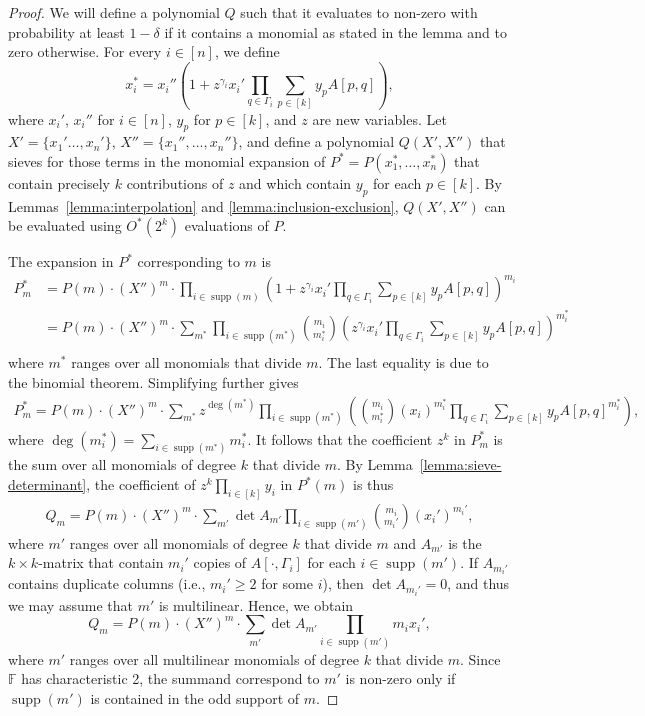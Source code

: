 \documentclass[10pt,a4paper]{article}
\newcommand{\F}{\ensuremath{\mathbb F}\xspace}
\DeclareMathOperator{\supp}{supp}
\begin{document}
\begin{proof}
  We will define a polynomial $Q$ such that it evaluates to non-zero with probability at least $1 - \delta$ if it contains a monomial as stated in the lemma and to zero otherwise.
  For every $i \in [n]$, we define
  \[
    x_i^* = x_i'' (1+z^{\gamma_i} x_i' \prod_{q \in \Gamma_i} \sum_{p \in [k]} y_{p} A[p,q]),
  \]
  where $x_i'$, $x_i''$ for $i \in [n]$, $y_p$ for $p \in [k]$, and $z$ are new variables. 
  Let $X' = \{ x_1' \ldots, x_n' \}$, $X'' = \{ x_1'', \ldots, x_n'' \}$, and define a polynomial $Q(X', X'')$ that 
  sieves for those terms in the monomial expansion of
  $P^* = P(x_1^*,\ldots,x_n^*)$ that contain precisely $k$ contributions of $z$ and 
  which contain $y_p$ for each $p \in [k]$.
  By Lemmas~\ref{lemma:interpolation} and \ref{lemma:inclusion-exclusion}, $Q(X', X'')$ can be evaluated using $O^*(2^{k})$ evaluations of $P$.

  The expansion in $P^*$ corresponding to $m$ is
  \begin{align*}
    P^*_m
    &= P(m) \cdot (X'')^m \cdot \prod_{i \in \supp(m)} (1+z^{\gamma_i} x_i' \prod_{q \in \Gamma_i} \sum_{p \in [k]} y_{p} A[p, q])^{m_i} \\
    &= P(m) \cdot (X'')^m \cdot  \sum_{m^*} \prod_{i \in \supp(m^*)} \binom{m_i}{m_i^*} (z^{\gamma_i} x_i' \prod_{q \in \Gamma_i} \sum_{p \in [k]} y_p A[p, q])^{m_i^*} \\
  \end{align*}
  where $m^*$ ranges over all monomials that divide $m$.
  The last equality is due to the binomial theorem.
  Simplifying further gives
  \begin{align*}
  P_m^* = P(m) \cdot (X'')^m \cdot \sum_{m^*} z^{\deg(m^*)} \prod_{i \in \supp(m^*)} \left( \binom{m_i}{m_i^*} (x_i)^{m_i^*} \prod_{q \in \Gamma_i} \sum_{p \in [k]} y_p A[p, q]^{m_i^*} \right),
  \end{align*}
  where $\deg(m_i^*) =\sum_{i \in \supp(m^*)} m_i^*$.
  It follows that the coefficient $z^k$ in $P_m^*$ is the sum over all monomials of degree $k$ that divide $m$.
  By Lemma~\ref{lemma:sieve-determinant}, the coefficient of $z^k \prod_{i \in [k]} y_i$ in $P^*(m)$ is thus
  \begin{align*}
    Q_m = P(m) \cdot (X'')^m \cdot \sum_{m'}  \det A_{m'} \prod_{i \in \supp(m')} \binom{m_i}{m_i'} (x_i')^{m_i'} ,
  \end{align*}
  where $m'$ ranges over all monomials of degree $k$ that divide $m$ and $A_{m'}$ is the $k \times k$-matrix that contain $m_i'$ copies of $A[\cdot, \Gamma_i]$ for each $i \in \supp(m')$.
  If $A_{m_i'}$ contains duplicate columns (i.e., $m_i' \ge 2$ for some $i$), then $\det A_{m_i'} = 0$, and thus we may assume that $m'$ is multilinear.
  Hence, we obtain
  \[
    Q_m = P(m) \cdot (X'')^m \cdot \sum_{m'} \det A_{m'} \prod_{i \in \supp(m')} m_i x_i' ,
  \]
  where $m'$ ranges over all multilinear monomials of degree $k$ that divide $m$.
  Since $\F$ has characteristic 2, the summand correspond to $m'$ is non-zero only if $\supp(m')$ is contained in the odd support of $m$.


\end{proof}
\end{document}
